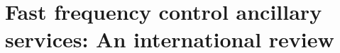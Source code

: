 \documentclass[11pt, a4paper]{article}
\begin{document}
\section{Fast frequency control ancillary services: An international review}
\end{document}
